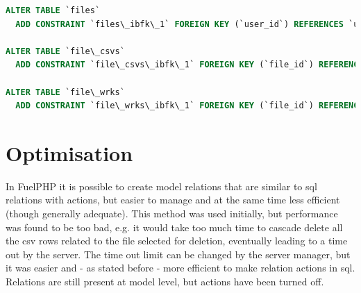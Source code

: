 \begin{lstlisting}[language=sql]
ALTER TABLE `files`
  ADD CONSTRAINT `files\_ibfk\_1` FOREIGN KEY (`user_id`) REFERENCES `users` (`id`) ON DELETE NO ACTION ON UPDATE NO ACTION;

ALTER TABLE `file\_csvs`
  ADD CONSTRAINT `file\_csvs\_ibfk\_1` FOREIGN KEY (`file_id`) REFERENCES `files` (`id`) ON DELETE CASCADE ON UPDATE NO ACTION;

ALTER TABLE `file\_wrks`
  ADD CONSTRAINT `file\_wrks\_ibfk\_1` FOREIGN KEY (`file_id`) REFERENCES `files` (`id`) ON DELETE CASCADE ON UPDATE NO ACTION;
\end{lstlisting}

\section{Optimisation}

In FuelPHP it is possible to create model relations that are similar to sql relations with actions, but easier to manage and at the same time less efficient (though generally adequate). This method was used initially, but performance was found to be too bad, e.g. it would take too much time to cascade delete all the csv rows related to the file selected for deletion, eventually leading to a time out by the server. The time out limit can be changed by the server manager, but it was easier and - as stated before - more efficient to make relation actions in sql. Relations are still present at model level, but actions have been turned off.
